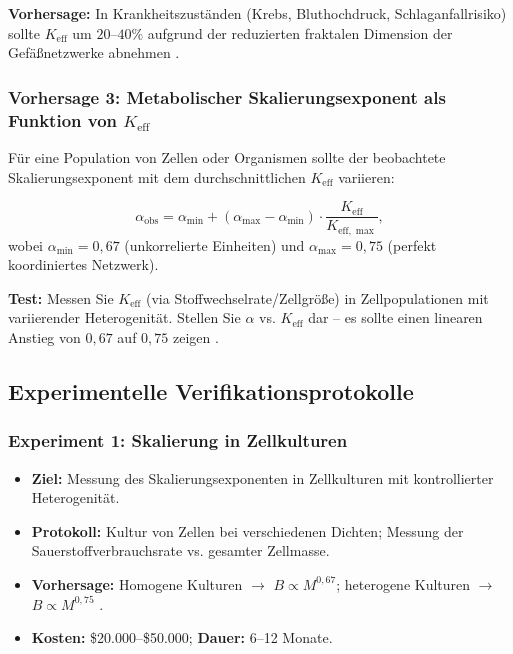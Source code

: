 \documentclass[12pt]{article}
\newcommand{\Keff}{K_{\mathrm{eff}}}
\begin{document}
	\textbf{Vorhersage:} In Krankheitszuständen (Krebs, Bluthochdruck, Schlaganfallrisiko) sollte \(\Keff\) um \(20\)–\(40\%\) aufgrund der reduzierten fraktalen Dimension der Gefäßnetzwerke abnehmen \cite{Gould1993}.
	
	\subsubsection{Vorhersage 3: Metabolischer Skalierungsexponent als Funktion von $\Keff$}
	
	Für eine Population von Zellen oder Organismen sollte der beobachtete Skalierungsexponent mit dem durchschnittlichen $\Keff$ variieren:
	
	\begin{equation}
		\alpha_{\text{obs}} = \alpha_{\min} + (\alpha_{\max} - \alpha_{\min}) \cdot \frac{\Keff}{K_{\mathrm{eff},\max}},
		\label{eq:scaling-exponent}
	\end{equation}
	wobei $\alpha_{\min} = 0,67$ (unkorrelierte Einheiten) und $\alpha_{\max} = 0,75$ (perfekt koordiniertes Netzwerk).
	
	\textbf{Test:} Messen Sie $\Keff$ (via Stoffwechselrate/Zellgröße) in Zellpopulationen mit variierender Heterogenität. Stellen Sie $\alpha$ vs. $\Keff$ dar – es sollte einen linearen Anstieg von $0,67$ auf $0,75$ zeigen \cite{Takemoto2015}.
	
	\subsection{Experimentelle Verifikationsprotokolle}
	
	\subsubsection{Experiment 1: Skalierung in Zellkulturen}
	\begin{itemize}
		\item \textbf{Ziel:} Messung des Skalierungsexponenten in Zellkulturen mit kontrollierter Heterogenität.
		\item \textbf{Protokoll:} Kultur von Zellen bei verschiedenen Dichten; Messung der Sauerstoffverbrauchsrate vs. gesamter Zellmasse.
		\item \textbf{Vorhersage:} Homogene Kulturen \(\rightarrow\) \(B \propto M^{0,67}\); heterogene Kulturen \(\rightarrow\) \(B \propto M^{0,75}\) \cite{Takemoto2015}.
		\item \textbf{Kosten:} \$20.000–\$50.000; \textbf{Dauer:} 6–12 Monate.
	\end{itemize}
	
\end{document}
